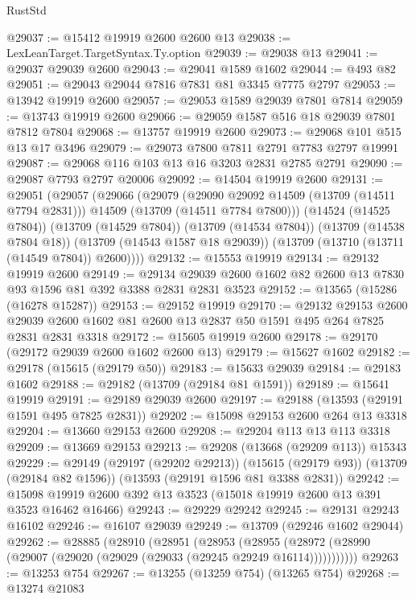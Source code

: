 \begin{lexlean}{RustStd}
\begin{coremodule}
@29037 := @15412 @19919 @2600 @2600 @13
@29038 := LexLeanTarget.TargetSyntax.Ty.option
@29039 := @29038 @13
@29041 := @29037 @29039 @2600
@29043 := @29041 @1589 @1602
@29044 := @493 @82
@29051 := @29043 @29044 @7816 @7831 @81 @3345 @7775 @2797
@29053 := @13942 @19919 @2600
@29057 := @29053 @1589 @29039 @7801 @7814
@29059 := @13743 @19919 @2600
@29066 := @29059 @1587 @516 @18 @29039 @7801 @7812 @7804
@29068 := @13757 @19919 @2600
@29073 := @29068 @101 @515 @13 @17 @3496
@29079 := @29073 @7800 @7811 @2791 @7783 @2797 @19991
@29087 := @29068 @116 @103 @13 @16 @3203 @2831 @2785 @2791
@29090 := @29087 @7793 @2797 @20006
@29092 := @14504 @19919 @2600
@29131 := @29051
    (@29057
      (@29066
        (@29079
          (@29090 @29092 @14509 (@13709 (@14511 @7794 @2831)))
          @14509
          (@13709 (@14511 @7784 @7800)))
        (@14524 (@14525 @7804))
        (@13709 (@14529 @7804))
        (@13709 (@14534 @7804))
        (@13709 (@14538 @7804 @18))
        (@13709 (@14543 @1587 @18 @29039))
        (@13709 (@13710 (@13711 (@14549 @7804)) @2600))))
@29132 := @15553 @19919
@29134 := @29132 @19919 @2600
@29149 := @29134 @29039 @2600 @1602 @82 @2600 @13 @7830 @93 @1596 @81 @392 @3388 @2831 @2831 @3523
@29152 := @13565 (@15286 (@16278 @15287))
@29153 := @29152 @19919
@29170 := @29132
    @29153
    @2600
    @29039
    @2600
    @1602
    @81
    @2600
    @13
    @2837
    @50
    @1591
    @495
    @264
    @7825
    @2831
    @2831
    @3318
@29172 := @15605 @19919 @2600
@29178 := @29170 (@29172 @29039 @2600 @1602 @2600 @13)
@29179 := @15627 @1602
@29182 := @29178 (@15615 (@29179 @50))
@29183 := @15633 @29039
@29184 := @29183 @1602
@29188 := @29182 (@13709 (@29184 @81 @1591))
@29189 := @15641 @19919
@29191 := @29189 @29039 @2600
@29197 := @29188 (@13593 (@29191 @1591 @495 @7825 @2831))
@29202 := @15098 @29153 @2600 @264 @13 @3318
@29204 := @13660 @29153 @2600
@29208 := @29204 @113 @13 @113 @3318
@29209 := @13669 @29153
@29213 := @29208 (@13668 (@29209 @113)) @15343
@29229 := @29149
    (@29197 (@29202 @29213))
    (@15615 (@29179 @93))
    (@13709 (@29184 @82 @1596))
    (@13593 (@29191 @1596 @81 @3388 @2831))
@29242 := @15098 @19919 @2600 @392 @13 @3523 (@15018 @19919 @2600 @13 @391 @3523 @16462 @16466)
@29243 := @29229 @29242
@29245 := @29131 @29243 @16102
@29246 := @16107 @29039
@29249 := @13709 (@29246 @1602 @29044)
@29262 := @28885
    (@28910
      (@28951
        (@28953
          (@28955 (@28972 (@28990 (@29007 (@29020 (@29029 (@29033 (@29245 @29249 @16114)))))))))))
@29263 := @13253 @754
@29267 := @13255 (@13259 @754) (@13265 @754)
@29268 := @13274 @21083

\end{coremodule}
\end{lexlean}
